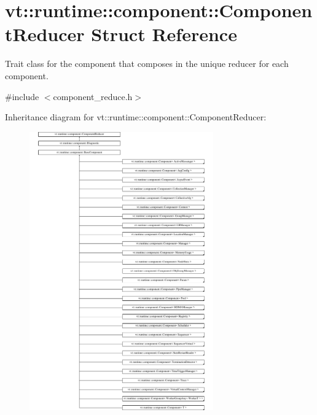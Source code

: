 \hypertarget{structvt_1_1runtime_1_1component_1_1_component_reducer}{}\section{vt\+:\+:runtime\+:\+:component\+:\+:Component\+Reducer Struct Reference}
\label{structvt_1_1runtime_1_1component_1_1_component_reducer}


Trait class for the component that composes in the unique reducer for each component.  




{\ttfamily \#include $<$component\+\_\+reduce.\+h$>$}

Inheritance diagram for vt\+:\+:runtime\+:\+:component\+:\+:Component\+Reducer\+:\begin{figure}[H]
\begin{center}
\leavevmode
\includegraphics[height=12.000000cm]{structvt_1_1runtime_1_1component_1_1_component_reducer}
\end{center}
\end{figure}
